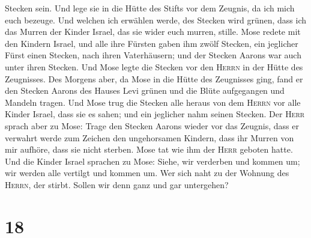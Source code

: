 Stecken sein.  Und lege sie in die Hütte des Stifts vor
dem Zeugnis, da ich mich euch bezeuge.  Und welchen ich
erwählen werde, des Stecken wird grünen, dass ich das Murren der Kinder
Israel, das sie wider euch murren, stille.  Mose redete
mit den Kindern Israel, und alle ihre Fürsten gaben ihm zwölf Stecken,
ein jeglicher Fürst einen Stecken, nach ihren Vaterhäusern; und der
Stecken Aarons war auch unter ihren Stecken.  Und Mose
legte die Stecken vor den \textsc{Herrn} in der Hütte des Zeugnisses.
 Des Morgens aber, da Mose in die Hütte des Zeugnisses
ging, fand er den Stecken Aarons des Hauses Levi grünen und die Blüte
aufgegangen und Mandeln tragen.  Und Mose trug die
Stecken alle heraus von dem \textsc{Herrn} vor alle Kinder Israel, dass
sie es sahen; und ein jeglicher nahm seinen Stecken.  Der
\textsc{Herr} sprach aber zu Mose: Trage den Stecken Aarons wieder vor
das Zeugnis, dass er verwahrt werde zum Zeichen den ungehorsamen
Kindern, dass ihr Murren von mir aufhöre, dass sie nicht sterben.
 Mose tat wie ihm der \textsc{Herr} geboten hatte.
 Und die Kinder Israel sprachen zu Mose: Siehe, wir
verderben und kommen um; wir werden alle vertilgt und kommen um.
 Wer sich naht zu der Wohnung des \textsc{Herrn}, der
stirbt. Sollen wir denn ganz und gar untergehen?

\hypertarget{section-17}{%
\section{18}\label{section-17}}


